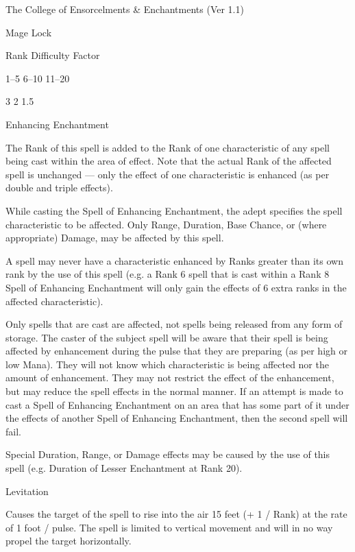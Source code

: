 \begin{Chapter}{The College of Ensorcelments \& Enchantments (Ver 1.1)}
\begin{spell}[S-6]{Mage Lock }
\begin{effects}
Rank  Difficulty Factor 

1–5 
6–10 
11–20 

3 
2 
1.5
\end{effects}
\end{spell}

\begin{spell}[S-7]{Enhancing Enchantment }
\begin{effects}
The Rank of this spell is added to the Rank of one characteristic of
any spell being cast within the area of effect. Note that the actual
Rank of the affected spell is unchanged — only the effect of one
characteristic is enhanced (as per double and triple effects).

While casting the Spell of Enhancing Enchantment, the adept specifies
the spell characteristic to be affected.  Only Range, Duration, Base
Chance, or (where appropriate) Damage, may be affected by this spell.

A spell may never have a characteristic enhanced by Ranks greater than
its own rank by the use of this spell (e.g.  a Rank 6 spell that is
cast within a Rank 8 Spell of Enhancing Enchantment will only gain the
effects of 6 extra ranks in the affected characteristic).

Only spells that are cast are affected, not spells being released from
any form of storage.  The caster of the subject spell will be aware
that their spell is being affected by enhancement during the pulse
that they are preparing (as per high or low Mana). They will not know
which characteristic is being affected nor the amount of enhancement.
They may not restrict the effect of the enhancement, but may reduce
the spell effects in the normal manner. If an attempt is made to
cast a Spell of Enhancing Enchantment on an area that has some part of
it under the effects of another Spell of Enhancing Enchantment, then
the second spell will fail.

Special Duration, Range, or Damage effects may be caused by the use of
this spell (e.g. Duration of Lesser Enchantment at Rank 20).
\end{effects}
\end{spell}

\begin{spell}[S-8]{Levitation }

\begin{effects}
Causes the target of the spell to rise into the air 15 feet (+ 1 /
Rank) at the rate of 1 foot / pulse.  The spell is limited to vertical
movement and will in no way propel the target horizontally.
\end{effects}
\end{spell}


\end{Chapter}
